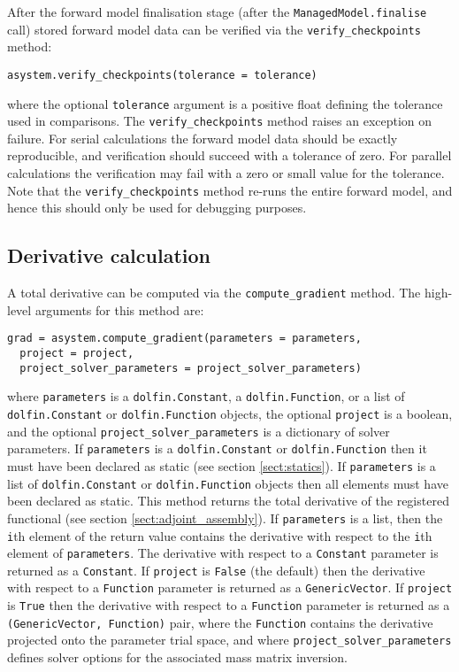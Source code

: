 \documentclass[a4paper]{book}
\begin{document}
After the forward model finalisation stage (after the \linebreak
\verb+ManagedModel.finalise+ call) stored forward model data can be verified via
the \verb+verify_checkpoints+ method:
\begin{lstlisting}
asystem.verify_checkpoints(tolerance = tolerance)
\end{lstlisting}
where the optional \verb+tolerance+ argument is a positive float defining the
tolerance used in comparisons. The \verb+verify_checkpoints+ method raises an
exception on failure. For serial calculations the forward model data should be
exactly reproducible, and verification should succeed with a tolerance of zero.
For parallel calculations the verification may fail with a zero or small value
for the tolerance. Note that the \verb+verify_checkpoints+ method re-runs the
entire forward model, and hence this should only be used for debugging purposes.

\subsection{Derivative calculation}

A total derivative can be computed via the \verb+compute_gradient+ method. The
high-level arguments for this method are:
\begin{lstlisting}
grad = asystem.compute_gradient(parameters = parameters,
  project = project,
  project_solver_parameters = project_solver_parameters)
\end{lstlisting}
where \verb+parameters+ is a \verb+dolfin.Constant+, a \verb+dolfin.Function+,
or a list of \verb+dolfin.Constant+ or \verb+dolfin.Function+ objects, the
optional \verb+project+ is a \linebreak boolean, and the optional
\verb+project_solver_parameters+ is a dictionary of solver parameters. If
\verb+parameters+ is a \verb+dolfin.Constant+ or \verb+dolfin.Function+ then it
must have been declared as static (see section \ref{sect:statics}). If
\verb+parameters+ is a list of \verb+dolfin.Constant+ or \verb+dolfin.Function+
objects then all elements must have been declared as static. This method returns
the total derivative of the registered functional (see section
\ref{sect:adjoint_assembly}). If \verb+parameters+ is a list, then the
\verb+i+th element of the return value contains the derivative with respect to
the \verb+i+th element of \verb+parameters+. The derivative with respect to a
\verb+Constant+ parameter is returned as a \verb+Constant+. If \verb+project+ is
\verb+False+ (the default) then the derivative with respect to a \verb+Function+
parameter is returned as a \verb+GenericVector+. If \verb+project+ is
\verb+True+ then the derivative with respect to a \verb+Function+ parameter is
returned as a \verb+(GenericVector, Function)+ pair, where the \verb+Function+
contains the derivative projected onto the parameter trial space, and where
\verb+project_solver_parameters+ defines solver options for the associated mass
matrix inversion.
\end{document}
